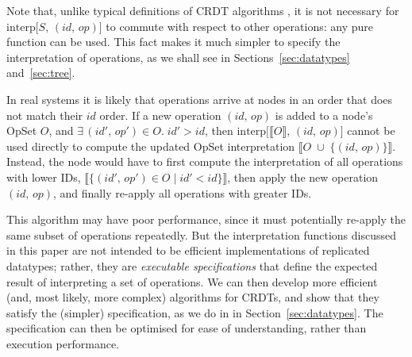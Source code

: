 Note that, unlike typical definitions of CRDT algorithms \cite{Shapiro:2011wy,Shapiro:2011un}, it is not necessary for $\mathrm{interp}\big[S,\, (\mathit{id},\, \mathit{op})\big]$ to commute with respect to other operations: any pure function can be used.
This fact makes it much simpler to specify the interpretation of operations, as we shall see in Sections~\ref{sec:datatypes} and~\ref{sec:tree}.

In real systems it is likely that operations arrive at nodes in an order that does not match their $\mathit{id}$ order.
If a new operation $(\mathit{id},\, \mathit{op})$ is added to a node's OpSet $O$, and $\exists\,(\mathit{id}',\, \mathit{op}') \in O.\; \mathit{id}' > \mathit{id}$,
then $\mathrm{interp}\big[\llbracket O \rrbracket,\, (\mathit{id},\, \mathit{op})\big]$ cannot be used directly to compute the updated OpSet interpretation
$\big\llbracket O \;\cup\; \{(\mathit{id},\, \mathit{op})\} \big\rrbracket$.
Instead, the node would have to first compute the interpretation of all operations with lower IDs,
$\big\llbracket \{(\mathit{id}',\, \mathit{op}') \in O \mid \mathit{id}' < \mathit{id}\} \big\rrbracket$,
then apply the new operation $(\mathit{id},\, \mathit{op})$, and finally re-apply all operations with greater IDs.

This algorithm may have poor performance, since it must potentially re-apply the same subset of operations repeatedly.
But the interpretation functions discussed in this paper are not intended to be efficient implementations of replicated datatypes; rather, they are \emph{executable specifications} that define the expected result of interpreting a set of operations.
We can then develop more efficient (and, most likely, more complex) algorithms for CRDTs, and show that they satisfy the (simpler) specification, as we do in in Section~\ref{sec:datatypes}.
The specification can then be optimised for ease of understanding, rather than execution performance.
